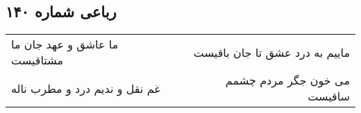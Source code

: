 \begin{center}
\section*{رباعی شماره ۱۴۰}
\label{sec:sh140}
\begin{longtable}{l p{0.5cm} r}
ما عاشق و عهد جان ما مشتاقیست
&&
ماییم به درد عشق تا جان باقیست
\\
غم نقل و ندیم درد و مطرب ناله
&&
می خون جگر مردم چشمم ساقیست
\\
\end{longtable}
\end{center}
